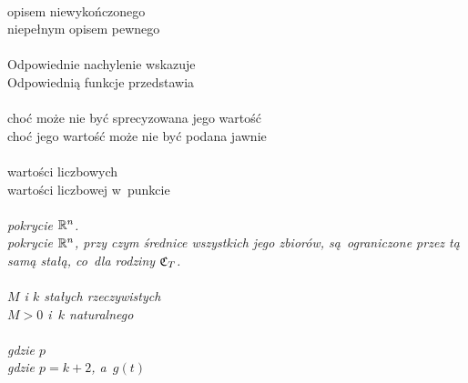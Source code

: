 \documentclass[a4paper,11pt]{article}
\begin{document}
\noi {} \\
\Jest opisem niewykończonego \\
\Powin niepełnym opisem pewnego \\
 \\
\Jest Odpowiednie nachylenie wskazuje \\
\Powin Odpowiednią funkcje przedstawia \\
 \\
\Jest choć może nie być sprecyzowana jego wartość \\
\Powin choć jego wartość może nie być podana jawnie \\
 \\
\Jest wartości liczbowych \\
\Powin wartości liczbowej w~punkcie \\
 \\
\Jest \emph{pokrycie $\mathbb{ R }^{ n }$.} \\
\Powin \emph{pokrycie $\mathbb{ R }^{ n }$, przy czym średnice wszystkich jego zbiorów,
  są~ograniczone przez tą samą stałą, co~dla rodziny $\mathfrak{C}_{ T }$.} \\
 \\
\Jest \emph{$M$ i $k$ stałych rzeczywistych} \\
\Powin \emph{$M > 0$ i~$k$ naturalnego} \\
 \\
\Jest \emph{gdzie $p$} \\
\Powin \emph{gdzie $p = k + 2$, a~$g( t )$} \\

\vspace{\spaceTwo}









\noi {}

\vspace{\spaceThree}
\end{document}
